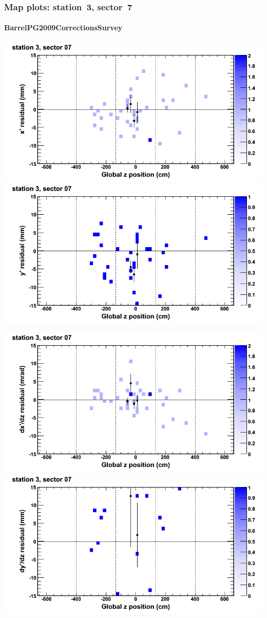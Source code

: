 \documentclass[compress]{beamer}
\begin{document}
\begin{frame}
\frametitle{Map plots: station~3, sector~7}
\framesubtitle{BarrelPG2009CorrectionsSurvey}
\includegraphics[width=0.5\linewidth]{mapplots_01/DTvsz_st3sec07_x.png}
\includegraphics[width=0.5\linewidth]{mapplots_01/DTvsz_st3sec07_y.png}

\includegraphics[width=0.5\linewidth]{mapplots_01/DTvsz_st3sec07_dxdz.png}
\includegraphics[width=0.5\linewidth]{mapplots_01/DTvsz_st3sec07_dydz.png}
\end{frame}
\end{document}
